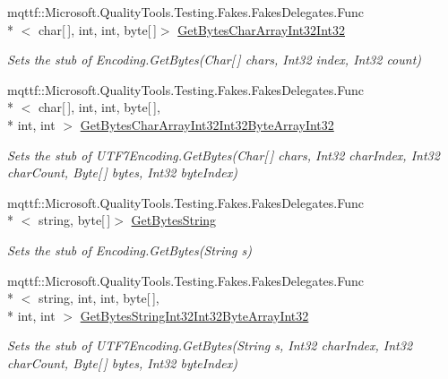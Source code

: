 \begin{DoxyCompactItemize}
mqttf\-::\-Microsoft.\-Quality\-Tools.\-Testing.\-Fakes.\-Fakes\-Delegates.\-Func\\*
$<$ char\mbox{[}$\,$\mbox{]}, int, int, byte\mbox{[}$\,$\mbox{]}$>$ \hyperlink{class_system_1_1_text_1_1_fakes_1_1_stub_u_t_f7_encoding_a170017e7137fe6167503854dedbe95fc}{Get\-Bytes\-Char\-Array\-Int32\-Int32}
\begin{DoxyCompactList}\small\item\em Sets the stub of Encoding.\-Get\-Bytes(\-Char\mbox{[}$\,$\mbox{]} chars, Int32 index, Int32 count)\end{DoxyCompactList}\item 
mqttf\-::\-Microsoft.\-Quality\-Tools.\-Testing.\-Fakes.\-Fakes\-Delegates.\-Func\\*
$<$ char\mbox{[}$\,$\mbox{]}, int, int, byte\mbox{[}$\,$\mbox{]}, \\*
int, int $>$ \hyperlink{class_system_1_1_text_1_1_fakes_1_1_stub_u_t_f7_encoding_a55f78c6872820c94ef1b4673291c0282}{Get\-Bytes\-Char\-Array\-Int32\-Int32\-Byte\-Array\-Int32}
\begin{DoxyCompactList}\small\item\em Sets the stub of U\-T\-F7\-Encoding.\-Get\-Bytes(\-Char\mbox{[}$\,$\mbox{]} chars, Int32 char\-Index, Int32 char\-Count, Byte\mbox{[}$\,$\mbox{]} bytes, Int32 byte\-Index)\end{DoxyCompactList}\item 
mqttf\-::\-Microsoft.\-Quality\-Tools.\-Testing.\-Fakes.\-Fakes\-Delegates.\-Func\\*
$<$ string, byte\mbox{[}$\,$\mbox{]}$>$ \hyperlink{class_system_1_1_text_1_1_fakes_1_1_stub_u_t_f7_encoding_a4ff41ba3874992e91635a821c71da0d3}{Get\-Bytes\-String}
\begin{DoxyCompactList}\small\item\em Sets the stub of Encoding.\-Get\-Bytes(\-String s)\end{DoxyCompactList}\item 
mqttf\-::\-Microsoft.\-Quality\-Tools.\-Testing.\-Fakes.\-Fakes\-Delegates.\-Func\\*
$<$ string, int, int, byte\mbox{[}$\,$\mbox{]}, \\*
int, int $>$ \hyperlink{class_system_1_1_text_1_1_fakes_1_1_stub_u_t_f7_encoding_afedba36c2f783da43a9f6e47d3c38eac}{Get\-Bytes\-String\-Int32\-Int32\-Byte\-Array\-Int32}
\begin{DoxyCompactList}\small\item\em Sets the stub of U\-T\-F7\-Encoding.\-Get\-Bytes(\-String s, Int32 char\-Index, Int32 char\-Count, Byte\mbox{[}$\,$\mbox{]} bytes, Int32 byte\-Index)\end{DoxyCompactList}\item 

\end{DoxyCompactItemize}
